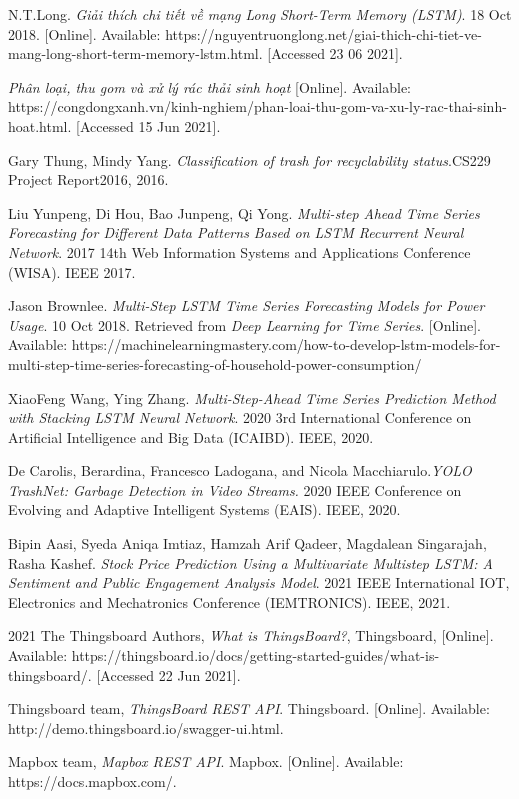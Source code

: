 \documentclass{Classes/UITBA}
\begin{document}
\begin{thebibliography}{SJL05}

 N.T.Long. \textit{Giải thích chi tiết về mạng Long Short-Term Memory (LSTM)}. 18 Oct 2018. [Online]. Available: https://nguyentruonglong.net/giai-thich-chi-tiet-ve-mang-long-short-term-memory-lstm.html. [Accessed 23 06 2021].

 \textit{Phân loại, thu gom và xử lý rác thải sinh hoạt} [Online]. Available: https://congdongxanh.vn/kinh-nghiem/phan-loai-thu-gom-va-xu-ly-rac-thai-sinh-hoat.html. [Accessed 15 Jun 2021].

 Gary Thung, Mindy Yang. \textit{Classification of trash for recyclability status}.CS229 Project Report2016, 2016.

 Liu Yunpeng, Di Hou, Bao Junpeng, Qi Yong. \textit{Multi-step Ahead Time Series Forecasting for Different Data Patterns Based on LSTM Recurrent Neural Network}. 2017 14th Web Information Systems and Applications Conference (WISA). IEEE 2017.

 Jason Brownlee. \textit{Multi-Step LSTM Time Series Forecasting Models for Power Usage}. 10 Oct 2018. Retrieved from \textit{Deep Learning for Time Series}. [Online]. Available: https://machinelearningmastery.com/how-to-develop-lstm-models-for-multi-step-time-series-forecasting-of-household-power-consumption/

 XiaoFeng Wang, Ying Zhang. \textit{Multi-Step-Ahead Time Series Prediction Method with Stacking LSTM Neural Network}. 2020 3rd International Conference on Artificial Intelligence and Big Data (ICAIBD). IEEE, 2020.

 De Carolis, Berardina, Francesco Ladogana, and Nicola Macchiarulo.\textit{YOLO TrashNet: Garbage Detection in Video Streams.} 2020 IEEE Conference on Evolving and Adaptive Intelligent Systems (EAIS). IEEE, 2020.

 Bipin Aasi, Syeda Aniqa Imtiaz, Hamzah Arif Qadeer, Magdalean Singarajah, Rasha Kashef. \textit{Stock Price Prediction Using a Multivariate Multistep LSTM: A Sentiment and Public Engagement Analysis Model}. 2021 IEEE International IOT, Electronics and Mechatronics Conference (IEMTRONICS). IEEE, 2021.

 2021 The Thingsboard Authors, \textit{What is ThingsBoard?}, Thingsboard, [Online]. Available: https://thingsboard.io/docs/getting-started-guides/what-is-thingsboard/. [Accessed 22 Jun 2021].

 Thingsboard team, \textit{ThingsBoard REST API}. Thingsboard. [Online]. Available: http://demo.thingsboard.io/swagger-ui.html.

 Mapbox team, \textit{Mapbox REST API}. Mapbox. [Online]. Available: https://docs.mapbox.com/.

\end{thebibliography}
\end{document}
